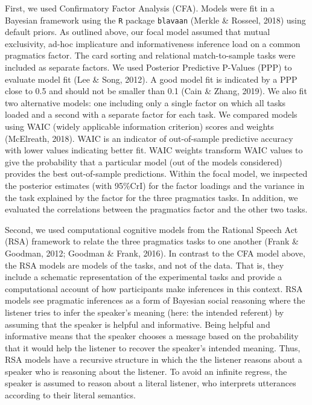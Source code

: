 \documentclass[
  man,floatsintext]{apa6}
\begin{document}
First, we used Confirmatory Factor Analysis (CFA). Models were fit in a Bayesian framework using the \texttt{R} package \texttt{blavaan} (Merkle \& Rosseel, 2018) using default priors. As outlined above, our focal model assumed that mutual exclusivity, ad-hoc implicature and informativeness inference load on a common pragmatics factor. The card sorting and relational match-to-sample tasks were included as separate factors. We used Posterior Predictive P-Values (PPP) to evaluate model fit (Lee \& Song, 2012). A good model fit is indicated by a PPP close to 0.5 and should not be smaller than 0.1 (Cain \& Zhang, 2019). We also fit two alternative models: one including only a single factor on which all tasks loaded and a second with a separate factor for each task. We compared models using WAIC (widely applicable information criterion) scores and weights (McElreath, 2018). WAIC is an indicator of out-of-sample predictive accuracy with lower values indicating better fit. WAIC weights transform WAIC values to give the probability that a particular model (out of the models considered) provides the best out-of-sample predictions. Within the focal model, we inspected the posterior estimates (with 95\%CrI) for the factor loadings and the variance in the task explained by the factor for the three pragmatics tasks. In addition, we evaluated the correlations between the pragmatics factor and the other two tasks.

Second, we used computational cognitive models from the Rational Speech Act (RSA) framework to relate the three pragmatics tasks to one another (Frank \& Goodman, 2012; Goodman \& Frank, 2016). In contrast to the CFA model above, the RSA models are models of the tasks, and not of the data. That is, they include a schematic representation of the experimental tasks and provide a computational account of how participants make inferences in this context. RSA models see pragmatic inferences as a form of Bayesian social reasoning where the listener tries to infer the speaker's meaning (here: the intended referent) by assuming that the speaker is helpful and informative. Being helpful and informative means that the speaker chooses a message based on the probability that it would help the listener to recover the speaker's intended meaning. Thus, RSA models have a recursive structure in which the the listener reasons about a speaker who is reasoning about the listener. To avoid an infinite regress, the speaker is assumed to reason about a literal listener, who interprets utterances according to their literal semantics.
\end{document}
